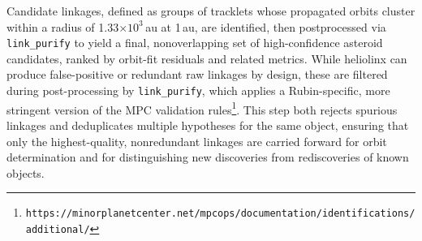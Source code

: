 Candidate linkages, defined as groups of tracklets whose propagated orbits cluster within a radius of 1.33$\xspace\times\xspace10^{3}$\,au at 1\,au,
are identified, then postprocessed via \texttt{link\_purify} to yield a final, nonoverlapping set of high-confidence asteroid candidates, ranked by orbit-fit residuals and related metrics.
While heliolinx can produce false-positive or redundant raw linkages by design, these are filtered during post-processing by \texttt{link\_purify}, which applies a Rubin-specific, more stringent version of the MPC validation rules\footnote{\nolinkurl{https://minorplanetcenter.net/mpcops/documentation/identifications/additional/}}.
This step both rejects spurious linkages and deduplicates multiple hypotheses for the same object, ensuring that only the highest-quality, nonredundant linkages are carried forward for orbit determination and for distinguishing new discoveries from rediscoveries of known objects.
